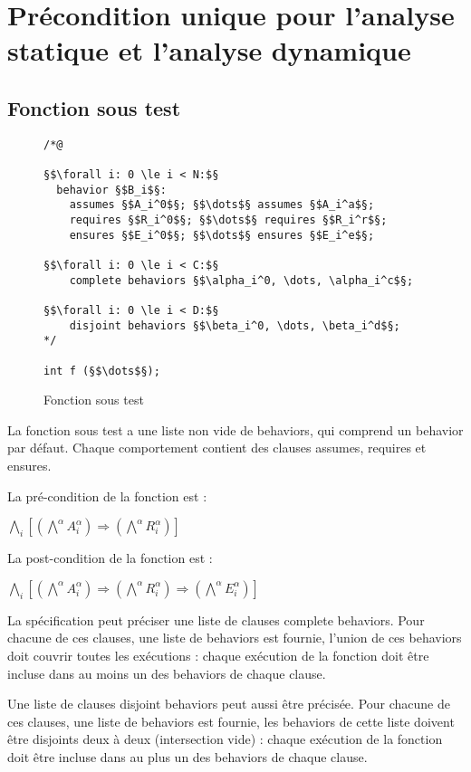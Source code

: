 
\chapter{Précondition unique pour l'analyse statique et l'analyse dynamique}

\section{Fonction sous test}


\begin{figure}[h]
  \begin{lstlisting}
/*@

§$\forall i: 0 \le i < N:$§
  behavior §$B_i$§:
    assumes §$A_i^0$§; §$\dots$§ assumes §$A_i^a$§;
    requires §$R_i^0$§; §$\dots$§ requires §$R_i^r$§;
    ensures §$E_i^0$§; §$\dots$§ ensures §$E_i^e$§;

§$\forall i: 0 \le i < C:$§
    complete behaviors §$\alpha_i^0, \dots, \alpha_i^c$§;

§$\forall i: 0 \le i < D:$§
    disjoint behaviors §$\beta_i^0, \dots, \beta_i^d$§;
*/

int f (§$\dots$§);
  \end{lstlisting}
  \caption{Fonction sous test}
\end{figure}


La fonction sous test a une liste non vide de behaviors, qui comprend un
behavior par défaut. Chaque comportement contient des clauses assumes, requires
et ensures.

La pré-condition de la fonction est :

$\bigwedge_i [ (\bigwedge^\alpha A_i^\alpha) \Longrightarrow
(\bigwedge^\alpha R_i^\alpha) ]$

La post-condition de la fonction est :

$\bigwedge_i [ (\bigwedge^\alpha A_i^\alpha) \Longrightarrow
(\bigwedge^\alpha R_i^\alpha) \Longrightarrow
(\bigwedge^\alpha E_i^\alpha) ]$

La spécification peut préciser une liste de clauses complete behaviors.
Pour chacune de ces clauses, une liste de behaviors est fournie, l'union de ces
behaviors doit couvrir toutes les exécutions : chaque exécution de la fonction
doit être incluse dans au moins un des behaviors de chaque clause.

Une liste de clauses disjoint behaviors peut aussi être précisée. Pour chacune
de ces clauses, une liste de behaviors est fournie, les behaviors de cette liste
doivent être disjoints deux à deux (intersection vide) : chaque exécution de la
fonction doit être incluse dans au plus un des behaviors de chaque clause.


